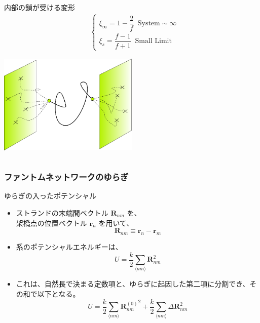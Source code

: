 \documentclass[12pt, dvipdfmx]{beamer}
\begin{document}
\begin{frame}
\begin{columns}[totalwidth=1\textwidth]
\begin{exampleblock}{内部の鎖が受ける変形}
\begin{align*}
							&\begin{cases}
							\xi_{\infty} = 1-\dfrac{2}{f} \;\; \text{System}\sim \infty \\[8pt]
							\xi_{s} = \dfrac{f-1}{f+1} \;\; \text{Small Limit}
							\end{cases}
					\end{align*}
					\vspace{-3mm}
					\begin{center}
						\includegraphics[width=0.5\textwidth]{phantom.png}
					\end{center}
				\end{exampleblock}
		\end{columns}
\end{frame}
\begin{frame}
	\frametitle{ファントムネットワークのゆらぎ}
		\begin{block}{ゆらぎの入ったポテンシャル}
			\begin{itemize}
				\item ストランドの末端間ベクトル $\bm{R}_{nm}$ を、\\架橋点の位置ベクトル $\bm{r}_n$ を用いて、
					\footnotesize
					\begin{equation*}
						\bm{R}_{nm} \equiv \bm{r}_n-\bm{r}_m
					\end{equation*}
					\normalsize
				\item 系のポテンシャルエネルギーは、
					\footnotesize
					\begin{equation*}
						U=\dfrac{k}{2} \sum_{\langle nm \rangle} \bm{R}_{nm}^2
					\end{equation*}
					\normalsize
				\item これは、自然長で決まる定数項と、ゆらぎに起因した第二項に分割でき、その和で以下となる。
					\footnotesize
					\begin{equation*}
						U=\dfrac{k}{2} \sum_{\langle nm \rangle} {\bm{R}_{nm}^{(0)}}^2 + \dfrac{k}{2} \sum_{\langle nm \rangle} \Delta \bm{R}_{nm}^2
					\end{equation*}
					\normalsize
			\end{itemize}
		\end{block}
\end{frame}
\end{document}
